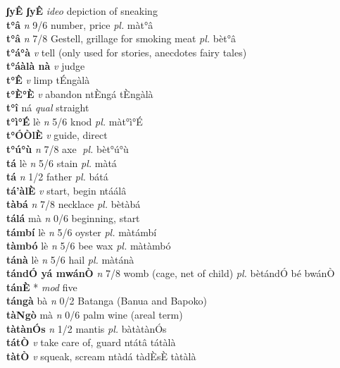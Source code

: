 \documentclass{article}
\begin{document}
{\bf ʃyÊ ʃyÊ}  {\it ideo} depiction of sneaking         \\ 
{\bf t°â}  {\it n} 9/6 number, price {\it pl.} màt°â         \\ 
{\bf t°â}  {\it n} 7/8 Gestell, grillage for smoking meat {\it pl.} bèt°â         \\ 
{\bf t°á°à}  {\it v} tell (only used for stories, anecdotes fairy tales)         \\ 
{\bf t°áàlà nà}  {\it v} judge         \\ 
{\bf t°Ê}  {\it v} limp      tÉngàlà   \\ 
{\bf t°È°È}  {\it v} abandon   ntÈngá   tÈngàlà   \\ 
{\bf t°î} ná {\it qual   } straight         \\ 
{\bf t°ì°É} lè {\it n} 5/6 knod {\it pl.} màt°ì°É         \\ 
{\bf t°ÓÒlÈ}  {\it v} guide, direct         \\ 
{\bf t°ú°ù}  {\it n} 7/8 axe {\it pl.} bèt°ú°ù         \\ 
{\bf tá} lè {\it n} 5/6 stain {\it pl.} màtá         \\ 
{\bf tá}  {\it n} 1/2 father {\it pl.} bátá         \\ 
{\bf tá'àlÈ}  {\it v} start, begin    ntáálâ      \\ 
{\bf tàbá}  {\it n} 7/8 necklace {\it pl.} bètàbá         \\ 
{\bf tálá} mà {\it n} 0/6 beginning, start         \\ 
{\bf támbí} lè {\it n} 5/6 oyster {\it pl.} màtámbí         \\ 
{\bf tàmbó} lè {\it n} 5/6 bee wax {\it pl.} màtàmbó         \\ 
{\bf tánà} lè {\it n} 5/6 hail {\it pl.} màtánà         \\ 
{\bf tándÓ yá mwánÒ}  {\it n} 7/8 womb (cage, net of child) {\it pl.} bètándÓ bé bwánÒ         \\ 
{\bf tánÈ} * {\it mod} five         \\ 
{\bf tángà} bà {\it n} 0/2 Batanga (Banua and Bapoko)         \\ 
{\bf tàNgò} mà {\it n} 0/6 palm wine (areal term)         \\ 
{\bf tàtànÓs}  {\it n} 1/2 mantis {\it pl.} bàtàtànÓs         \\ 
{\bf tátÒ}  {\it v} take care of, guard   ntátâ   tátàlà   \\ 
{\bf tàtÒ}  {\it v} squeak, scream   ntàdá  tàdÈsÈ tàtàlà   \\ 
\end{document}
